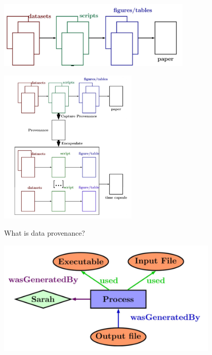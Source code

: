 \documentclass[ignorenonframetext,]{beamer}
\begin{document}
\begin{frame}{}
\protect\hypertarget{section-4}{}

\includegraphics[width=0.7\textwidth,height=\textheight]{cise1.png}

\end{frame}

\begin{frame}{}
\protect\hypertarget{section-5}{}

\includegraphics[width=0.5\textwidth,height=\textheight]{cise2.png}

\end{frame}

\begin{frame}{What is data provenance?}
\protect\hypertarget{what-is-data-provenance}{}

\includegraphics[width=0.8\textwidth,height=\textheight]{provw3c.png}

\end{frame}
\end{document}
